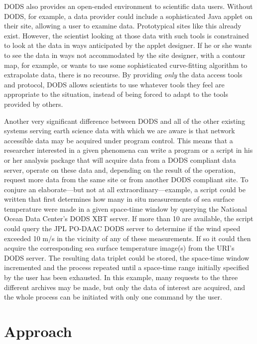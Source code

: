 \documentclass[12pt]{article}
\begin{document}
\ac{DODS} also provides an open-ended environment to scientific data
users.  Without \ac{DODS}, for example, a data provider could include
a sophisticated Java applet on their site, allowing a user to examine
data. Prototypical sites like this already exist. However, the
scientist looking at those data with such tools is constrained to look
at the data in ways anticipated by the applet
designer. If he or she wants to see the data in ways not accommodated
by the site designer, with a contour map, for example, or wants to use
some sophisticated curve-fitting algorithm to extrapolate data, there
is no recourse. By providing \emph{only} the data access tools and
protocol, \ac{DODS} allows scientists to use whatever tools they feel
are appropriate to the situation, instead of being forced to adapt to
the tools provided by others.

Another very significant difference between \ac{DODS} and all of the
other existing systems serving earth science data with which we are
aware is that network accessible data may be acquired under program
control. This means that a researcher interested in a given phenomena
can write a program or a script in his or her analysis package that
will acquire data from a \ac{DODS} compliant data server, operate on
these data and, depending on the result of the operation, request more
data from the same site or from another \ac{DODS} compliant site. To
conjure an elaborate---but not at all extraordinary---example, a script
could be written that first determines how many in situ measurements
of sea surface temperature were made in a given space-time window by
querying the National Ocean Data Center's \ac{DODS} \ac{XBT} server. If
more than 10 are available, the script could query the \ac{JPL}
\ac{PO-DAAC} \ac{DODS} server to determine if the wind speed exceeded
10 m/s in the vicinity of any of these measurements. If so it could
then acquire the corresponding sea surface temperature image(s) from
the \ac{URI}'s \ac{DODS} server.  The resulting data triplet could be
stored, the space-time window incremented and the process repeated
until a space-time range initially specified by the user has been
exhausted. In this example, many requests to the three different
archives may be made, but only the data of interest are acquired, and
the whole process can be initiated with only one command by the
user.

\section{Approach}\label{approach}
\end{document}
